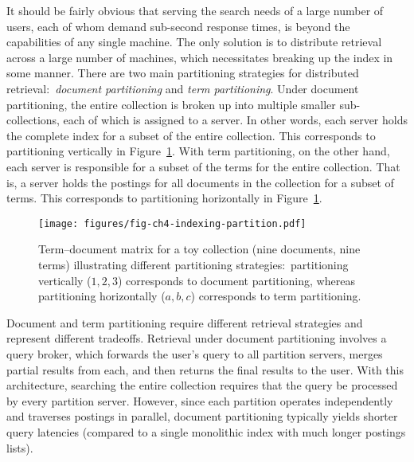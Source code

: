 It should be fairly obvious that serving the search needs of a large
number of users, each of whom demand sub-second response times, is
beyond the capabilities of any single machine.  The only solution is
to distribute retrieval across a large number of machines, which
necessitates breaking up the index in some manner.  There are two main
partitioning strategies for distributed retrieval:\ \emph{document
  partitioning} and \emph{term partitioning}.  Under document
partitioning, the entire collection is broken up into multiple smaller
sub-collections, each of which is assigned to a server.  In other
words, each server holds the complete index for a subset of the entire
collection.  This corresponds to partitioning vertically in
Figure~\ref{chapter-indexing:partition}.  With term partitioning, on
the other hand, each server is responsible for a subset of the terms
for the entire collection.  That is, a server holds the postings for
all documents in the collection for a subset of terms.  This
corresponds to partitioning horizontally in
Figure~\ref{chapter-indexing:partition}.

\begin{figure}[t]
\begin{center}
\vspace{0.2cm}
\texttt{[image: figures/fig-ch4-indexing-partition.pdf]}
\vspace{-0.3cm}
\end{center}
\caption{Term--document matrix for a toy collection (nine documents,
  nine terms) illustrating different partitioning
  strategies:\ partitioning vertically ($1,2,3$) corresponds to
  document partitioning, whereas partitioning horizontally ($a,b,c$)
  corresponds to term partitioning.}
\label{chapter-indexing:partition}
\end{figure}

Document and term partitioning require different retrieval strategies
and represent different tradeoffs.  Retrieval under document
partitioning involves a query broker, which forwards the user's query
to all partition servers, merges partial results from each, and then
returns the final results to the user.  With this architecture,
searching the entire collection requires that the query be processed
by every partition server.  However, since each partition operates
independently and traverses postings in parallel, document
partitioning typically yields shorter query latencies (compared to a
single monolithic index with much longer postings lists).  

